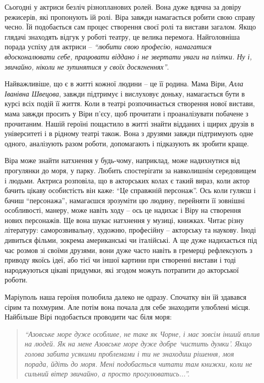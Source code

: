
Сьогодні у актриси безліч різнопланових ролей. Вона дуже вдячна за довіру
режисерів, які пропонують їй ролі. Віра завжди намагається робити свою справу
чесно. Їй подобається сам процес створення своєї ролі та вистави загалом. Якщо
глядачі знаходять відгук у роботі театру, це велика перемога. Найголовніша
порада успіху для актриси – \emph{\enquote{любити свою професію, намагатися вдосконалювати
себе, працювати віддано і не звертати уваги на плітки. Ну і, звичайно, ніколи
не зупинятися у своїх досягненнях}}.

Найважливіше, що є в житті кожної людини – це її родина. Мама Віри, \emph{Алла
Іванівна Швецова}, завжди підтримує і вислуховує доньку, намагається бути в
курсі всіх подій її життя. Коли в театрі розпочинається створення нової
вистави, мама завжди просить у Віри п'єсу, щоб прочитати і проаналізувати
побачене з прочитаним. Нашій героїні пощастило в житті знайти відданих і щирих
друзів в університеті і в рідному театрі також. Вона з друзями завжди
підтримують одне одного, аналізують разом роботи, допомагають і підказують як
зробити краще.

Віра може знайти натхнення у будь-чому, наприклад, може надихнутися від
прогулянки до моря, у парку. Любить спостерігати за навколишнім середовищем і
людьми. Актриса розповіла, що в акторських колах є такий вираз, коли актор
бачить цікаву особистість він каже: \enquote{Це справжній персонаж}. Ось коли
гуляєш і бачиш \enquote{персонажа}, намагаєшся зрозуміти цю людину, перейняти
її зовнішні особливості, манеру, може навіть ходу – ось це надихає і Віру на
створення нових персонажів. Ще вона шукає натхнення у музиці, книжках. Читає
різну літературу: саморозвивальну, художню, професійну – акторську та наукову.
Іноді дивиться фільми, зокрема американські чи італійські. А ще дуже
надихається під час розмов зі своїми друзями, вони дуже часто навіть в гремерці
рефлексують з приводу якоїсь ідеї, або тієї чи іншої картини при створенні
вистави і тоді народжуються цікаві придумки, які згодом можуть потрапити до
акторської роботи.

Маріуполь наша героїня полюбила далеко не одразу. Спочатку він їй здавався
сірим та похмурим. Але потім вона почала для себе знаходити улюблені місця.
Найбільше Вірі подобається проводити час біля моря: 

\begin{quote}
\em\enquote{Азовське море дуже
особливе, не таке як Чорне, і має зовсім інший вплив на людей. Як на мене
Азовське море дуже добре \enquote{чистить думки}. Якщо голова забита усякими
проблемами і ти не знаходиш рішення, моя порада, йдіть до моря. Мені
подобається читати там книжки, коли не сильний вітер звичайно, а  просто
прогулюватись...}. 
\end{quote}

